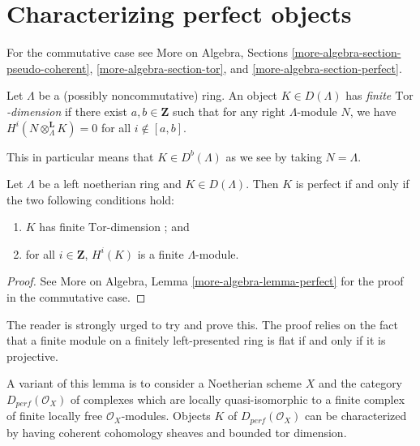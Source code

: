 \section{Characterizing perfect objects}
\label{section-characterizing-perfect}

\noindent
For the commutative case see
More on Algebra, Sections
\ref{more-algebra-section-pseudo-coherent},
\ref{more-algebra-section-tor}, and
\ref{more-algebra-section-perfect}.

\begin{definition}
\label{definition-finite-tor-dimension}
Let $\Lambda$ be a (possibly noncommutative) ring.
An object $K\in D(\Lambda)$ has {\it finite $\text{Tor}$-dimension}
if there exist $a, b \in \mathbf{Z}$ such that for any
right $\Lambda$-module $N$, we have
$H^i(N \otimes_{\Lambda}^\mathbf{L} K) = 0$ for all
$i \not \in [a, b]$.
\end{definition}

\noindent
This in particular means that $K \in D^b(\Lambda)$ as we see by taking
$N = \Lambda$.

\begin{lemma}
\label{lemma-characterize-perfect}
Let $\Lambda$ be a left noetherian ring and $K\in D(\Lambda)$. Then $K$ is
perfect if and only if the two following conditions hold:
\begin{enumerate}
\item
$K$ has finite $\text{Tor}$-dimension ; and
\item
for all $i \in \mathbf{Z}$, $H^i(K)$ is a finite $\Lambda$-module.
\end{enumerate}
\end{lemma}

\begin{proof}
See More on Algebra, Lemma \ref{more-algebra-lemma-perfect}
for the proof in the commutative case.
\end{proof}

\noindent
The reader is strongly urged to try and prove this. The proof relies on the
fact that a finite module on a finitely left-presented ring is flat if and only
if it is projective.

\begin{remark}
\label{remark-variant}
A variant of this lemma is to consider a Noetherian scheme $X$
and the category $D_{perf}(\mathcal{O}_X)$ of complexes which are locally
quasi-isomorphic to a finite complex of finite locally free
$\mathcal{O}_X$-modules. Objects $K$ of $D_{perf}(\mathcal{O}_X)$
can be characterized by having coherent cohomology sheaves and
bounded tor dimension.
\end{remark}









